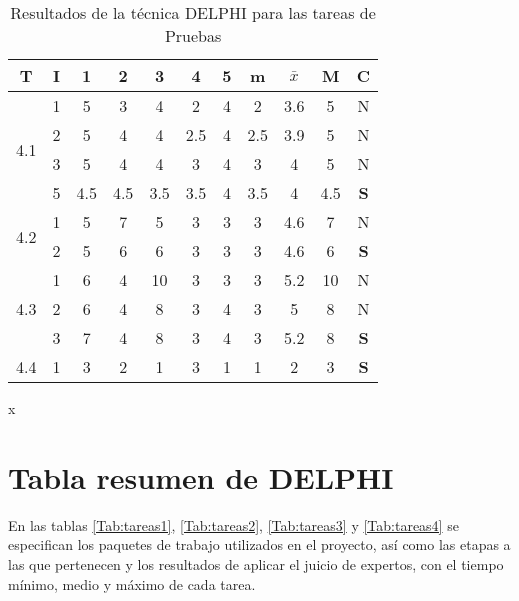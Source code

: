 \documentclass[11pt,a4paper,spanish,twoside]{report}
\begin{document}
\begin{table}[!h]
\centering
  \begin{tabular}{|c|c||c|c|c|c|c||c|c|c||c|}
    \hline
    \textbf{T} & \textbf{I} & \textbf{1} &
    \textbf{2} & \textbf{3} & \textbf{4} & \textbf{5} & \textbf{m}
    &\textbf{$\bar{x}$} &\textbf{M} & \textbf{C}\\    
    \hline \hline
    \multirow{4}{*}{4.1}& 1 & 5 & 3 & 4 & 2 & 4 & 2 & 3.6 & 5 & N \\
    & 2 & 5 & 4 & 4 & 2.5 & 4 & 2.5 & 3.9 & 5 & N \\
    & 3 & 5 & 4 & 4 & 3 & 4 & 3 & 4 & 5 & N \\
    & 5 & 4.5 & 4.5 & 3.5 & 3.5 & 4 & 3.5 & 4 & 4.5 & \textbf{S} \\    
    \hline
    
    \multirow{2}{*}{4.2}& 1 & 5 & 7 & 5 & 3 & 3 & 3 & 4.6 & 7 & N \\
    & 2 & 5 & 6 & 6 & 3 & 3 & 3 & 4.6 & 6 & \textbf{S} \\
    \hline
    \multirow{3}{*}{4.3}& 1 & 6 & 4 & 10 & 3 & 3 & 3 & 5.2 & 10 & N \\
    & 2 & 6 & 4 & 8 & 3 & 4 & 3 & 5 & 8 & N \\
    & 3 & 7 & 4 & 8 & 3 & 4 & 3 & 5.2 & 8 & \textbf{S} \\
    \hline
    4.4 & 1 & 3 & 2 & 1 & 3 & 1 & 1 & 2 & 3 & \textbf{S} \\
    \hline
  \end{tabular}
  \caption{Resultados de la técnica DELPHI para las tareas de Pruebas} x\label{Tab:pru}
\end{table} 
\section{Tabla resumen de DELPHI}
En las tablas \ref{Tab:tareas1}, \ref{Tab:tareas2}, \ref{Tab:tareas3} y \ref{Tab:tareas4} se especifican los paquetes de trabajo
utilizados en el proyecto, así como las etapas a las que pertenecen y los
resultados de aplicar el juicio de expertos, con el tiempo mínimo, medio y
máximo de cada tarea.
\end{document}
